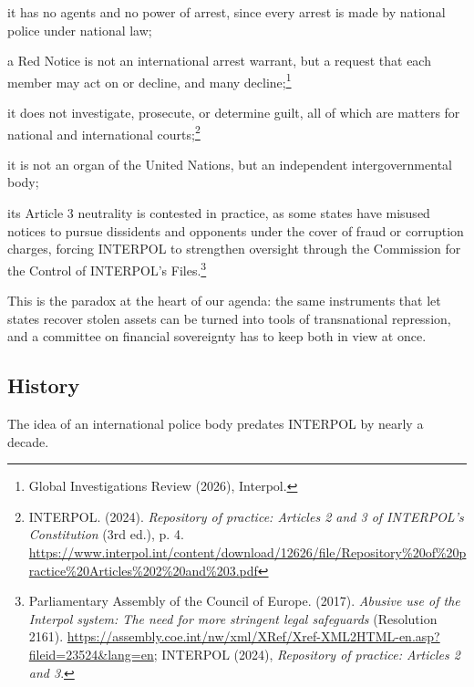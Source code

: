 \begin{keypoints}
  \item it has no agents and no power of arrest, since every arrest is made by national police under national law;
  \item a Red Notice is not an international arrest warrant, but a request that each member may act on or decline, and many decline;\footnote{Global Investigations Review (2026), Interpol.}
  \item it does not investigate, prosecute, or determine guilt, all of which are matters for national and international courts;\footnote{INTERPOL. (2024). \emph{Repository of practice: Articles 2 and 3 of INTERPOL’s Constitution} (3rd ed.), p. 4. \url{https://www.interpol.int/content/download/12626/file/Repository\%20of\%20practice\%20Articles\%202\%20and\%203.pdf}}
  \item it is not an organ of the United Nations, but an independent intergovernmental body;
  \item its Article 3 neutrality is contested in practice, as some states have misused notices to pursue dissidents and opponents under the cover of fraud or corruption charges, forcing INTERPOL to strengthen oversight through the Commission for the Control of INTERPOL’s Files.\footnote{Parliamentary Assembly of the Council of Europe. (2017). \emph{Abusive use of the Interpol system: The need for more stringent legal safeguards} (Resolution 2161). \url{https://assembly.coe.int/nw/xml/XRef/Xref-XML2HTML-en.asp?fileid=23524&lang=en}; INTERPOL (2024), \emph{Repository of practice: Articles 2 and 3}.}
\end{keypoints}

This is the paradox at the heart of our agenda: the same instruments that let states recover stolen assets can be turned into tools of transnational repression, and a committee on financial sovereignty has to keep both in view at once.

\subsection{History}

The idea of an international police body predates INTERPOL by nearly a decade.

